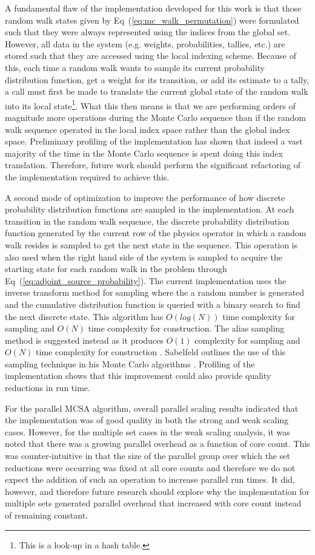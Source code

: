 A fundamental flaw of the implementation developed for this work is
that those random walk states given by
Eq~(\ref{eq:mc_walk_permutation}) were formulated such that they were
always represented using the indices from the global set. However, all
data in the system (e.g. weights, probabilities, tallies, etc.) are
stored such that they are accessed using the local indexing
scheme. Because of this, each time a random walk wants to sample its
current probability distribution function, get a weight for its
transition, or add its estimate to a tally, a call must first be made
to translate the current global state of the random walk into its
local state\footnote{This is a look-up in a hash table.}. What this
then means is that we are performing orders of magnitude more
operations during the Monte Carlo sequence than if the random walk
sequence operated in the local index space rather than the global
index space. Preliminary profiling of the implementation has shown
that indeed a vast majority of the time in the Monte Carlo sequence is
spent doing this index translation. Therefore, future work should
perform the significant refactoring of the implementation required to
achieve this.

A second mode of optimization to improve the performance of how
discrete probability distribution functions are sampled in the
implementation. At each transition in the random walk sequence, the
discrete probability distribution function generated by the current
row of the physics operator in which a random walk resides is sampled
to get the next state in the sequence. This operation is also used
when the right hand side of the system is sampled to acquire the
starting state for each random walk in the problem through
Eq~(\ref{eq:adjoint_source_probability}). The current implementation
uses the inverse transform method for sampling where the a random
number is generated and the cumulative distribution function is
queried with a binary search to find the next discrete state. This
algorithm has $O(log(N))$ time complexity for sampling and $O(N)$ time
complexity for construction. The alias sampling method is suggested
instead as it produces $O(1)$ complexity for sampling and $O(N)$ time
complexity for construction \cite{smith_analysis_2005}. Sabelfeld
outlines the use of this sampling technique in his Monte Carlo
algorithms \cite{sabelfeld_sparsified_2009}. Profiling of the
implementation shows that this improvement could also provide quality
reductions in run time.

For the parallel MCSA algorithm, overall parallel scaling results
indicated that the implementation was of good quality in both the
strong and weak scaling cases. However, for the multiple set cases in
the weak scaling analysis, it was noted that there was a growing
parallel overhead as a function of core count. This was
counter-intuitive in that the size of the parallel group over which
the set reductions were occurring was fixed at all core counts and
therefore we do not expect the addition of such an operation to
increase parallel run times. It did, however, and therefore future
research should explore why the implementation for multiple sets
generated parallel overhead that increased with core count instead of
remaining constant.

